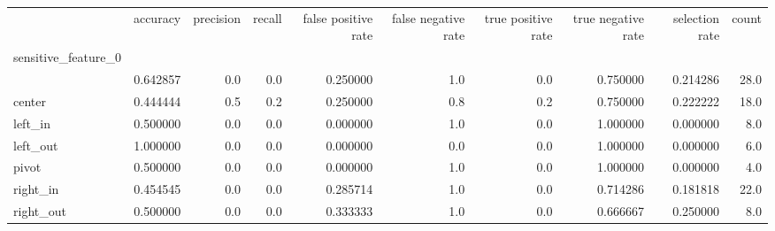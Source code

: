 \begin{tabular}{lrrrrrrrrr}
\toprule
{} &  accuracy &  precision &  recall &  false positive rate &  false negative rate &  true positive rate &  true negative rate &  selection rate &  count \\
sensitive\_feature\_0 &           &            &         &                      &                      &                     &                     &                 &        \\
\midrule
                    &  0.642857 &        0.0 &     0.0 &             0.250000 &                  1.0 &                 0.0 &            0.750000 &        0.214286 &   28.0 \\
center              &  0.444444 &        0.5 &     0.2 &             0.250000 &                  0.8 &                 0.2 &            0.750000 &        0.222222 &   18.0 \\
left\_in             &  0.500000 &        0.0 &     0.0 &             0.000000 &                  1.0 &                 0.0 &            1.000000 &        0.000000 &    8.0 \\
left\_out            &  1.000000 &        0.0 &     0.0 &             0.000000 &                  0.0 &                 0.0 &            1.000000 &        0.000000 &    6.0 \\
pivot               &  0.500000 &        0.0 &     0.0 &             0.000000 &                  1.0 &                 0.0 &            1.000000 &        0.000000 &    4.0 \\
right\_in            &  0.454545 &        0.0 &     0.0 &             0.285714 &                  1.0 &                 0.0 &            0.714286 &        0.181818 &   22.0 \\
right\_out           &  0.500000 &        0.0 &     0.0 &             0.333333 &                  1.0 &                 0.0 &            0.666667 &        0.250000 &    8.0 \\
\bottomrule
\end{tabular}
